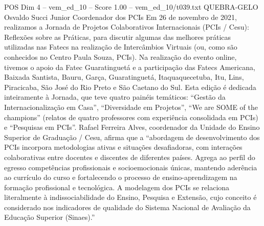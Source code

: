 \begin{textsample}{POS Dim 4 – vem\_ed\_10 – Score 1.00 – vem\_ed\_10/t039.txt}  \label{ex:f4_pos_137}
QUEBRA-GELO Osvaldo Succi Junior Coordenador dos PCIs Em 26 de novembro de 2021, realizamos a Jornada de Projetos Colaborativos Internacionais (PCIs / Cesu): Reflexões sobre as Práticas, para discutir algumas das melhores práticas utilizadas nas Fatecs na realização de Intercâmbios Virtuais (ou, como são conhecidos no Centro Paula Souza, PCIs).
Na realização do evento online, tivemos o apoio da Fatec Guaratinguetá e a participação das Fatecs Americana, Baixada Santista, Bauru, Garça, Guaratinguetá, Itaquaquecetuba, Itu, Lins, Piracicaba, São José do Rio Preto e São Caetano do Sul.
Esta edição é dedicada inteiramente à Jornada, que teve quatro painéis temáticos: “Gestão da Internacionalização em Casa”, “Diversidade em Projetos”, “We are SOME of the champions” (relatos de quatro professores com experiência consolidada em PCIs) e “Pesquisas em PCIs”.
Rafael Ferreira Alves, coordenador da Unidade do Ensino Superior de Graduação / Cesu, afirma que a “abordagem de desenvolvimento dos PCIs incorpora metodologias ativas e situações desafiadoras, com interações colaborativas entre docentes e discentes de diferentes países.
Agrega ao perfil do egresso competências profissionais e socioemocionais únicas, mantendo aderência ao currículo do curso e fortalecendo o processo de ensino-aprendizagem na formação profissional e tecnológica.
A modelagem dos PCIs se relaciona literalmente à indissociabilidade do Ensino, Pesquisa e Extensão, cujo conceito é considerado nos indicadores de qualidade do Sistema Nacional de Avaliação da Educação Superior (Sinaes).”

\end{textsample}
